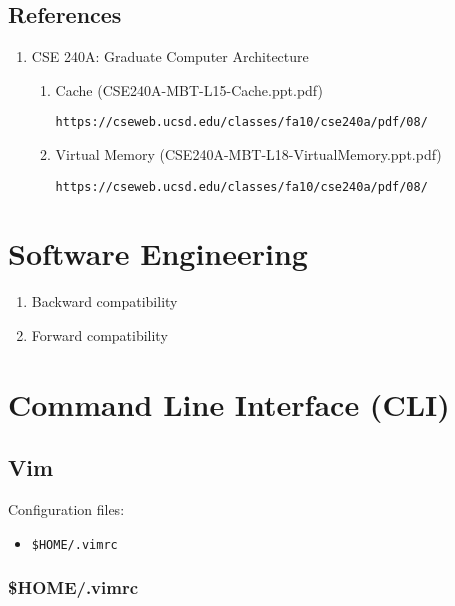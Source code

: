\documentclass[12pt,a4paper]{article}
\begin{document}
\subsection{References}

\begin{enumerate}

\item CSE 240A: Graduate Computer Architecture

	\begin{enumerate}

	\item Cache (CSE240A-MBT-L15-Cache.ppt.pdf)

	\texttt{https://cseweb.ucsd.edu/classes/fa10/cse240a/pdf/08/}

	\item Virtual Memory (CSE240A-MBT-L18-VirtualMemory.ppt.pdf)

	\texttt{https://cseweb.ucsd.edu/classes/fa10/cse240a/pdf/08/}

	\end{enumerate}

\end{enumerate}

\section{Software Engineering}

\begin{enumerate}
\item Backward compatibility
\item Forward compatibility
\end{enumerate}

\section{Command Line Interface (CLI)}

\subsection{Vim}

Configuration files:

\begin{itemize}
\item \verb"$HOME/.vimrc"
\end{itemize}

\subsubsection{\$HOME/.vimrc}
\end{document}
